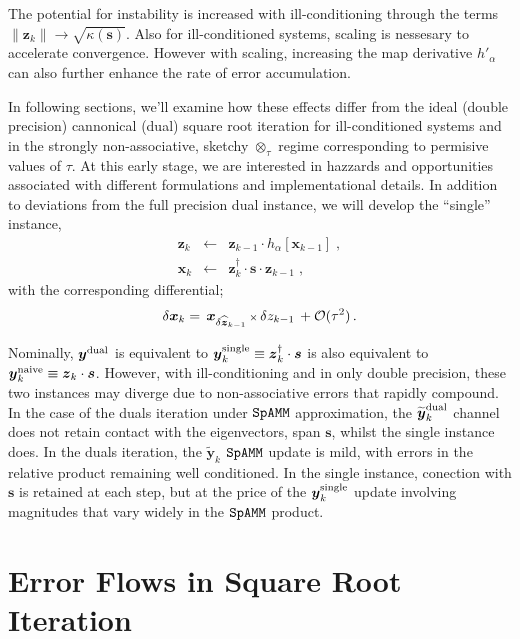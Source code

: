 \documentclass[letterpaper,twocolumn,amsmath,amsfont,amssymb,english,aps,jcp,preprintnumbers,groupaddress,nofootinbib,tightenlines,floatfix]{revtex4}
\newcommand{\mat}[1]{\boldsymbol{#1}}
\newcommand{\ot}{  {\scriptstyle \otimes}_{ \tau } }
\theoremstyle{plain}
\theoremstyle{remark}
\theoremstyle{plain}
\begin{document}
The potential for
instability is increased with ill-conditioning through the terms $\lVert \mat{z}_{k} \rVert  \rightarrow \sqrt{\kappa\left(\mat{s} \right)}$.
Also for ill-conditioned systems, scaling is nessesary to accelerate convergence.  However with scaling, increasing the map 
derivative $h'_\alpha$ can also further enhance the rate of error accumulation. 

In following sections, we'll examine how these effects differ from the ideal (double precision) cannonical (dual) square root iteration
for ill-conditioned systems and in the strongly non-associative, sketchy $\ot$ regime corresponding to permisive values of $\tau$.
At this early stage, we are interested in hazzards and opportunities associated with
different formulations and implementational details.   In addition to deviations from the full precision dual instance,
we will develop the  ``single'' instance,
\begin{eqnarray}\label{single}
\mat{z}_k &\leftarrow& \mat{z}_{k-1} \cdot h_\alpha \left[ \mat{x}_{k-1} \right] \; , \nonumber \\
\mat{x}_k &\leftarrow&  \mat{z}^\dagger_{k} \cdot \mat{s} \cdot \mat{z}_{k-1} \; ,
\end{eqnarray}
with the corresponding differential;
\begin{equation} \label{firstordersingle}
\delta \mat{x}_k = \,  { \mat{x}}_{\delta \widehat{\mat{z}}_{k-1}}  \, {\scriptstyle \times} \, \delta z_{k-1}  \, + {\cal O}(\tau^2)  \, .
\end{equation}

Nominally, $\mat{y}^{\rm dual}$ is equivalent to $\mat{y}^{\rm single}_k \equiv \mat{z}^\dagger_{k} \cdot \mat{s}$ 
is also equivalent to $\mat{y}^{\rm naive}_k \equiv \mat{z}_{k} \cdot \mat{s}$.
However, with ill-conditioning and in only double precision, these two instances may diverge due to non-associative errors that rapidly compound.
In the case of the duals iteration under $\tt SpAMM$ approximation, the $\widetilde{\mat{y}}^{\rm dual}_k$ channel does not retain contact 
with the eigenvectors, span $\mat{s}$, whilst the single instance does.  
In the duals iteration, the $\widetilde{\mat{y}}_k$  $\tt SpAMM$ update 
is mild, with errors in the relative product remaining well conditioned.  
In the single instance, conection with $\mat{s}$ is retained at each step, but at the price of the 
$\mat{y}^{\rm single}_k$ update involving magnitudes that vary widely in the $\tt SpAMM$ product.     

\section{Error Flows in Square Root Iteration}
\end{document}
